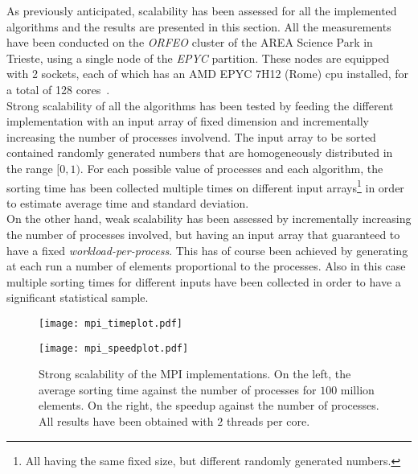 \documentclass[../main.tex]{subfiles}
\begin{document}
As previously anticipated, scalability has been assessed for all the 
implemented algorithms and the results are presented in this section. All the
measurements have been conducted on the \textit{ORFEO} cluster of the AREA Science Park in Trieste, using a single node of the \textit{EPYC} partition. These nodes are equipped with 2 sockets, each of which has an AMD EPYC 7H12 (Rome) cpu installed, for a total of 128 cores~\cite{epyc}.\\
Strong scalability of all the algorithms has been tested by feeding the different implementation with an input array of fixed dimension and incrementally increasing the number of processes involvend. The input array to be sorted contained randomly generated numbers that are homogeneously distributed in the range $[0,1)$. For each possible value of processes and each algorithm, the sorting time has been collected multiple times on different input arrays\footnote{All having the same fixed size, but different randomly generated numbers.} in order to estimate average time and standard deviation.\\
On the other hand, weak scalability has been assessed by incrementally increasing the number of processes involved, but having an input array that guaranteed to have a fixed \textit{workload-per-process}. This has of course been achieved by generating at each run a number of elements proportional to the processes. Also in this case multiple sorting times for different inputs have been collected in order to have a significant statistical sample.\\
\begin{figure}[b]
    \centering
    \begin{minipage}{0.50\textwidth}
        \centering
        \texttt{[image: mpi\_timeplot.pdf]}
    \end{minipage}\hfill
    \begin{minipage}{0.50\textwidth}
        \centering
        \texttt{[image: mpi\_speedplot.pdf]}
    \end{minipage}

    \caption{Strong scalability of the MPI implementations. On the left, the average sorting time against the number of processes for $100$ million elements. On the right, the speedup against the number of processes. All results have been obtained with $2$ threads per core.}
    \label{fig:strong_mpi}
\end{figure}
\end{document}
